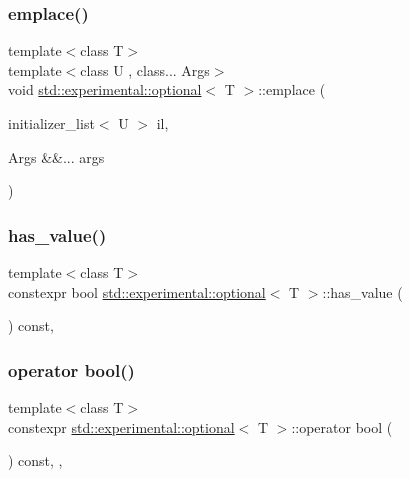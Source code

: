 \subsubsection{\texorpdfstring{emplace()}{emplace()}\hspace{0.1cm}{\footnotesize\ttfamily [2/2]}}
{\footnotesize\ttfamily template$<$class T$>$ \\
template$<$class U , class... Args$>$ \\
void \hyperlink{classstd_1_1experimental_1_1optional}{std\+::experimental\+::optional}$<$ T $>$\+::emplace (\begin{DoxyParamCaption}\item[{initializer\+\_\+list$<$ U $>$}]{il,  }\item[{Args \&\&...}]{args }\end{DoxyParamCaption})\hspace{0.3cm}{\ttfamily [inline]}}

\mbox{\label{classstd_1_1experimental_1_1optional_a98002656a42c0339158cc0bce10c89a4}} 
\subsubsection{\texorpdfstring{has\+\_\+value()}{has\_value()}}
{\footnotesize\ttfamily template$<$class T$>$ \\
constexpr bool \hyperlink{classstd_1_1experimental_1_1optional}{std\+::experimental\+::optional}$<$ T $>$\+::has\+\_\+value (\begin{DoxyParamCaption}{ }\end{DoxyParamCaption}) const\hspace{0.3cm}{\ttfamily [inline]}, {\ttfamily [noexcept]}}

\mbox{\label{classstd_1_1experimental_1_1optional_ac97eb00f6c8eb86920755ca75c31c24c}} 
\subsubsection{\texorpdfstring{operator bool()}{operator bool()}}
{\footnotesize\ttfamily template$<$class T$>$ \\
constexpr \hyperlink{classstd_1_1experimental_1_1optional}{std\+::experimental\+::optional}$<$ T $>$\+::operator bool (\begin{DoxyParamCaption}{ }\end{DoxyParamCaption}) const\hspace{0.3cm}{\ttfamily [inline]}, {\ttfamily [explicit]}, {\ttfamily [noexcept]}}

